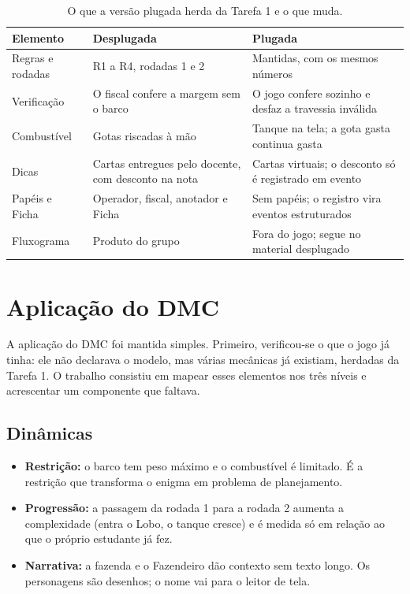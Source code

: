 \documentclass[12pt]{article}
\begin{document}
\begin{table}[ht]
\centering
\small
\caption{O que a versão plugada herda da Tarefa 1 e o que muda.}
\label{tab:adaptacao}
\begin{tabular}{@{}>{\raggedright\arraybackslash}p{3.0cm}>{\raggedright\arraybackslash}p{3.4cm}>{\raggedright\arraybackslash}p{4.6cm}@{}}
\toprule
\textbf{Elemento} & \textbf{Desplugada} & \textbf{Plugada} \\
\midrule
Regras e rodadas & R1 a R4, rodadas 1 e 2 & Mantidas, com os mesmos números \\
Verificação & O fiscal confere a margem sem o barco & O jogo confere sozinho e desfaz a travessia inválida \\
Combustível & Gotas riscadas à mão & Tanque na tela; a gota gasta continua gasta \\
Dicas & Cartas entregues pelo docente, com desconto na nota & Cartas virtuais; o desconto só é registrado em evento \\
Papéis e Ficha & Operador, fiscal, anotador e Ficha & Sem papéis; o registro vira eventos estruturados \\
Fluxograma & Produto do grupo & Fora do jogo; segue no material desplugado \\
\bottomrule
\end{tabular}
\end{table}

\section{Aplicação do DMC}

A aplicação do DMC foi mantida simples. Primeiro, verificou-se o que o jogo já
tinha: ele não declarava o modelo, mas várias mecânicas já existiam, herdadas da
Tarefa 1. O trabalho consistiu em mapear esses elementos nos três níveis e
acrescentar um componente que faltava.

\subsection{Dinâmicas}

\begin{itemize}
  \item \textbf{Restrição:} o barco tem peso máximo e o combustível é limitado.
        É a restrição que transforma o enigma em problema de planejamento.
  \item \textbf{Progressão:} a passagem da rodada 1 para a rodada 2 aumenta a
        complexidade (entra o Lobo, o tanque cresce) e é medida só em relação ao
        que o próprio estudante já fez.
  \item \textbf{Narrativa:} a fazenda e o Fazendeiro dão contexto sem texto longo.
        Os personagens são desenhos; o nome vai para o leitor de tela.
\end{itemize}
\end{document}
